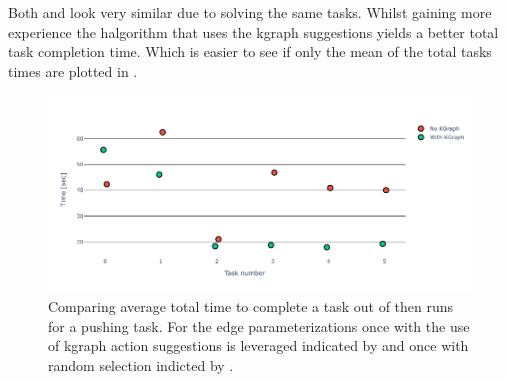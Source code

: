 Both  and  look very similar due to solving the same tasks. Whilst gaining more experience the \ac{halgorithm} that uses the \ac{kgraph} suggestions yields a better total task completion time. Which is easier to see if only the mean of the total tasks times are plotted in . 

\begin{figure}[H]
    \centering
    \includegraphics[width=\textwidth]{figures/results/random_push_time_vs}
    \caption{Comparing average total time to complete a task out of then runs for a pushing task. For the edge parameterizations once with the use of \ac{kgraph} action suggestions is leveraged indicated by  and once with random selection indicted by .}%
    \label{fig:random_push_time_vs}
\end{figure}


